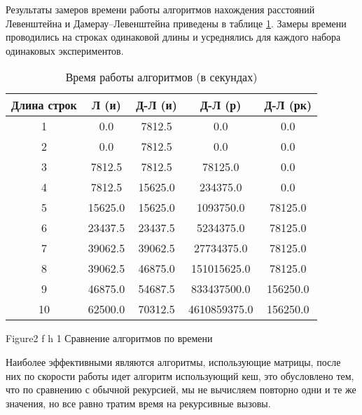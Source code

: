 Результаты замеров времени работы алгоритмов нахождения расстояний
Левенштейна и Дамерау–Левенштейна приведены в таблице \ref{tbl:time_measurements}. Замеры времени проводились на строках одинаковой длины и усреднялись для каждого набора одинаковых экспериментов.

\begin{table}[h]
	\begin{center}
		\begin{threeparttable}
			\captionsetup{justification=raggedright,singlelinecheck=off}
			\caption{Время работы алгоритмов (в секундах)}
			\label{tbl:time_measurements}
			\begin{tabular}{|c|c|c|c|c|}
				\hline
				Длина строк &  Л (и)  & Д-Л (и) & Д-Л (р) & Д-Л (рк) \\
				\hline
				1 & 0.0 & 7812.5 & 0.0 & 0.0 \\
				\hline
				2 & 0.0 & 7812.5 & 0.0 & 0.0 \\
				\hline
				3 & 7812.5 & 7812.5 & 78125.0 & 0.0 \\
				\hline
				4 & 7812.5 & 15625.0 & 234375.0 & 0.0 \\
				\hline
				5 & 15625.0 & 15625.0 & 1093750.0 & 78125.0 \\
				\hline
				6 & 23437.5 & 23437.5 & 5234375.0 & 78125.0 \\
				\hline
				7 & 39062.5 & 39062.5 & 27734375.0 & 78125.0 \\
				\hline
				8 & 39062.5 & 46875.0 & 151015625.0 & 78125.0 \\
				\hline
				9 & 46875.0 & 54687.5 & 833437500.0 & 156250.0 \\
				\hline
				10 & 62500.0 & 70312.5 & 4610859375.0 & 156250.0 \\
				\hline
				
				
			\end{tabular}
		\end{threeparttable}
	\end{center}
\end{table}

{Figure2} %
{f} %
{h} %
{1\textwidth} %
{Сравнение алгоритмов по времени} %

\clearpage

Наиболее эффективными являются алгоритмы, использующие матрицы, после них по скорости работы идет алгоритм использующий кеш, это обусловлено тем, что по сравнению с обычной рекурсией, мы не вычисляем повторно одни и те же значения, но все равно тратим время на рекурсивные вызовы. 

